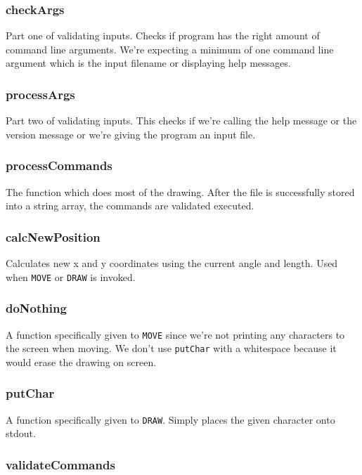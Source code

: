 \documentclass[a4paper, 12pt, titlepage]{article}
\newcommand{\code}[1]{\small\texttt{#1}\normalsize}
\begin{document}
\subsubsection{checkArgs}

Part one of validating inputs. Checks if program has the right amount of
command line arguments. We're expecting a minimum of one command line
argument which is the input filename or displaying help messages.

\subsubsection{processArgs}

Part two of validating inputs. This checks if we're calling the help message
or the version message or we're giving the program an input file.

\subsubsection{processCommands}

The function which does most of the drawing. After the file is successfully
stored into a string array, the commands are validated executed.

\subsubsection{calcNewPosition}

Calculates new x and y coordinates using the current angle and length.
Used when \code{MOVE} or \code{DRAW} is invoked.

\subsubsection{doNothing}

A function specifically given to \code{MOVE} since we're not printing any
characters to the screen when moving. We don't use \code{putChar} with a
whitespace because it would erase the drawing on screen.

\subsubsection{putChar}

A function specifically given to \code{DRAW}. Simply places the given
character onto stdout.

\subsubsection{validateCommands}
\end{document}
